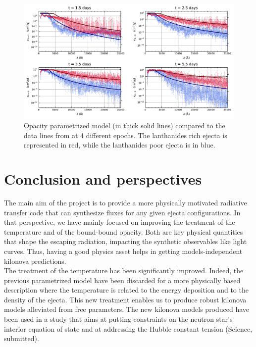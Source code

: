 \documentclass[a4paper, twoside, 11pt]{article}
\numberwithin{equation}{section}
\begin{document}
\begin{figure}[h!]
    \advance\leftskip-1cm
\includegraphics[scale=0.9]{pictures/opac_ccl_allepochs.pdf}
\caption[Opacity parametrized model compared to line transitions data]{Opacity parametrized model (in thick solid lines) compared to the data lines from \cite{tanaka} at 4 different epochs. The lanthanides rich ejecta is represented in red, while the lanthanides poor ejecta is in blue.}
\label{fig:cclOpacWork}
\end{figure}
\clearpage
\section*{Conclusion and perspectives}
\vspace{10pt}
\hspace{\parindent} The main aim of the project is to provide a more physically motivated radiative transfer code that can synthesize fluxes for any given ejecta configurations. In that perspective,  we have mainly focused on improving the treatment of the temperature and of the bound-bound opacity. Both are key physical quantities that shape the escaping radiation, impacting the synthetic observables like light curves. Thus, having a good physics asset helps in getting  models-independent kilonova predictions. \\

The treatment of the temperature has been significantly improved. Indeed, the previous parametrized model have been discarded for a more physically based description where the temperature is related to the energy deposition and to the density of the ejecta. This new treatment enables us to produce robust kilonova models alleviated  from free parameters. The new kilonova models produced have been used in a study that aims at putting constraints on the neutron star's interior equation of state and  at addressing the Hubble constant tension \cite{first_paper} (Science, submitted).\\
\end{document}
